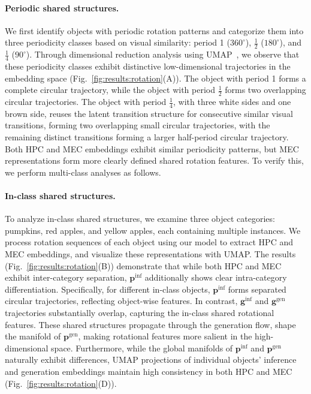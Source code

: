 \paragraph{Periodic shared structures.}
\label{sec:analysis:periodic-reuse}
We first identify objects with periodic rotation patterns and categorize them into three periodicity classes based on visual similarity: period 1 ($360^{\circ}$), $\frac{1}{2}$ ($180^{\circ}$), and $\frac{1}{4}$ ($90^{\circ}$).
Through dimensional reduction analysis using UMAP~\citep{mcinnes2018umap}, we observe that these periodicity classes exhibit distinctive low-dimensional trajectories in the embedding space (Fig.~\ref{fig:results:rotation}(A)). The object with period 1 forms a complete circular trajectory, while the object with period $\frac{1}{2}$ forms two overlapping circular trajectories. The object with period $\frac{1}{4}$, with three white sides and one brown side, reuses the latent transition structure for consecutive similar visual transitions, forming two overlapping small circular trajectories, with the remaining distinct transitions forming a larger half-period circular trajectory.
Both HPC and MEC embeddings exhibit similar periodicity patterns, but MEC representations form more clearly defined shared rotation features. To verify this, we perform multi-class analyses as follows.
\vspace{-0.2cm}
\paragraph{In-class shared structures.}
\label{sec:analysis:in-class-reuse}
To analyze in-class shared structures, we examine three object categories: pumpkins, red apples, and yellow apples, each containing multiple instances. We process rotation sequences of each object using our model to extract HPC and MEC embeddings, and visualize these representations with UMAP. The results (Fig.~\ref{fig:results:rotation}(B)) demonstrate that while both HPC and MEC exhibit inter-category separation, $\boldsymbol{p}^{\text{inf}}$ additionally shows clear intra-category differentiation. Specifically, for different in-class objects, $\boldsymbol{p}^{\text{inf}}$ forms separated circular trajectories, reflecting object-wise features. In contrast, $\boldsymbol{g}^{\text{inf}}$ and $\boldsymbol{g}^{\text{gen}}$ trajectories substantially overlap, capturing the in-class shared rotational features. These shared structures propagate through the generation flow, shape the manifold of $\boldsymbol{p}^{\text{gen}}$, making rotational features more salient in the high-dimensional space. 
Furthermore, while the global manifolds of $\boldsymbol{p}^{\text{inf}}$ and $\boldsymbol{p}^{\text{gen}}$ naturally exhibit differences, UMAP projections of individual objects' inference and generation embeddings maintain high consistency in both HPC and MEC (Fig.~\ref{fig:results:rotation}(D)).


